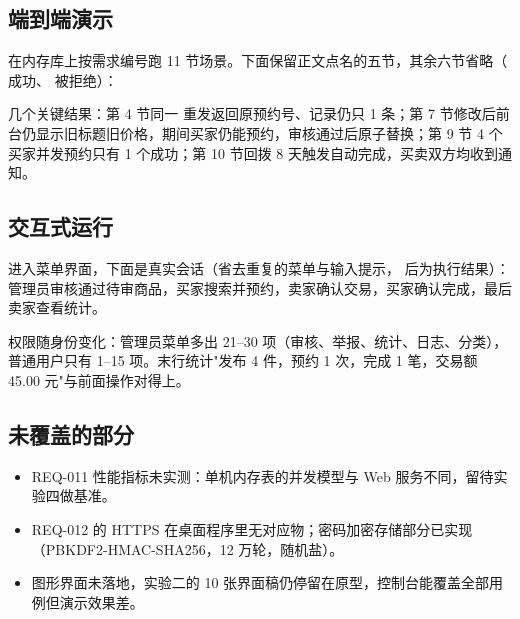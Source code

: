 \subsection{端到端演示}

 在内存库上按需求编号跑 11 节场景。下面保留正文点名的五节，其余六节省略（ 成功、 被拒绝）：



几个关键结果：第 4 节同一  重发返回原预约号、记录仍只 1 条；第 7 节修改后前台仍显示旧标题旧价格，期间买家仍能预约，审核通过后原子替换；第 9 节 4 个买家并发预约只有 1 个成功；第 10 节回拨 8 天触发自动完成，买卖双方均收到通知。

\subsection{交互式运行}

 进入菜单界面，下面是真实会话（省去重复的菜单与输入提示， 后为执行结果）：管理员审核通过待审商品，买家搜索并预约，卖家确认交易，买家确认完成，最后卖家查看统计。



权限随身份变化：管理员菜单多出 21--30 项（审核、举报、统计、日志、分类），普通用户只有 1--15 项。末行统计"发布 4 件，预约 1 次，完成 1 笔，交易额 45.00 元"与前面操作对得上。

\subsection{未覆盖的部分}

\begin{itemize}[leftmargin=1.6em,itemsep=2pt,topsep=3pt]
\item REQ-011 性能指标未实测：单机内存表的并发模型与 Web 服务不同，留待实验四做基准。
\item REQ-012 的 HTTPS 在桌面程序里无对应物；密码加密存储部分已实现（PBKDF2-HMAC-SHA256，12 万轮，随机盐）。
\item 图形界面未落地，实验二的 10 张界面稿仍停留在原型，控制台能覆盖全部用例但演示效果差。
\end{itemize}
